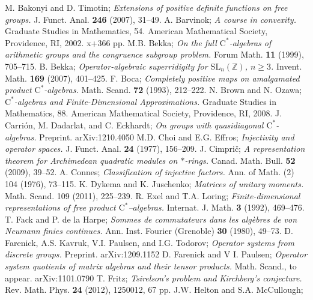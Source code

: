 \documentclass[12pt]{amsart}
\theoremstyle{definition}
\begin{document}
\begin{thebibliography}{MM}
 M. Bakonyi and D. Timotin;
\emph{Extensions of positive definite functions on free groups.}
J. Funct. Anal. \textbf{246} (2007), 31--49.
 A. Barvinok;
\emph{A course in convexity.}
Graduate Studies in Mathematics, 54. American Mathematical Society, Providence, RI, 2002. x+366 pp.
 M.B. Bekka;
\emph{On the full $\mathrm{C}^ *$-algebras of arithmetic groups and the congruence subgroup problem.}
Forum Math.  \textbf{11} (1999), 705--715.
 B. Bekka;
\emph{Operator-algebraic superridigity for $\mathrm{SL}_n({\mathbb Z})$, $n\geq 3$.}
Invent. Math. \textbf{169} (2007), 401--425.
 F. Boca;
\emph{Completely positive maps on amalgamated product $\mathrm{C}^*$-algebras.}
Math. Scand. \textbf{72} (1993), 212--222.
 N. Brown and N. Ozawa;
\emph{$\mathrm{C}^*$-algebras and Finite-Dimensional Approximations.}
Graduate Studies in Mathematics, 88.
American Mathematical Society, Providence, RI, 2008.
 J. Carri\'on, M. Dadarlat, and C. Eckhardt;
\emph{On groups with quasidiagonal $\mathrm{C}^*$-algebras.}
Preprint. arXiv:1210.4050
 M.D. Choi and E.G. Effros;
\emph{Injectivity and operator spaces.}
J. Funct. Anal. \textbf{24} (1977), 156--209.
 J. Cimpri\v c;
\emph{A representation theorem for Archimedean quadratic modules on $*$-rings.}
Canad. Math. Bull. \textbf{52} (2009), 39--52.
 A. Connes;
\emph{Classification of injective factors.} Ann. of Math. (2) 104 (1976), 73--115.
 K. Dykema and K. Juschenko;
\emph{Matrices of unitary moments.}
Math. Scand. 109 (2011), 225--239.
 R. Exel and T.A. Loring;
\emph{Finite-dimensional representations of free product $\mathrm{C}^*$--algebras.}
Internat. J. Math. \textbf{3} (1992), 469--476.
 T. Fack and P. de la Harpe;
\emph{Sommes de commutateurs dans les alg\`ebres de von Neumann finies continues.}
Ann. Inst. Fourier (Grenoble) \textbf{30} (1980), 49--73.
 D. Farenick, A.S. Kavruk, V.I. Paulsen, and I.G. Todorov;
\emph{Operator systems from discrete groups.}
Preprint. arXiv:1209.1152
 D. Farenick and V I. Paulsen;
\emph{Operator system quotients of matrix algebras and their tensor products.}
Math. Scand., to appear. arXiv:1101.0790
 T. Fritz;
\emph{Tsirelson's problem and Kirchberg's conjecture.}
Rev. Math. Phys. \textbf{24} (2012), 1250012, 67 pp.
 J.W. Helton and S.A. McCullough;

\end{thebibliography}
\end{document}
